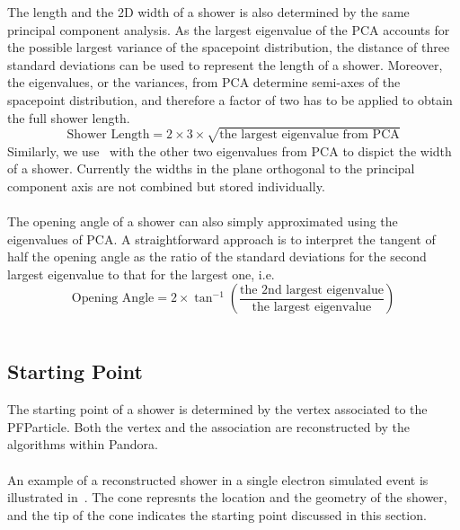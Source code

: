 The length and the 2D width of a shower is also determined by the same
principal component analysis.
As the largest eigenvalue of the PCA accounts for the possible largest
variance of the spacepoint distribution, the distance of three
standard deviations can be used to represent the length of a shower.
Moreover, the eigenvalues, or the variances, from PCA determine semi-axes
of the spacepoint distribution, and therefore a factor of two has to be
applied to obtain the full shower length.
\begin{equation}
\label{eq:shrlength}
\textrm{Shower Length} = 2\times 3\times \sqrt{\textrm{the largest eigenvalue from PCA}}
\end{equation}
Similarly, we use~ with the other two eigenvalues
from PCA to dispict the width of a shower.
Currently the widths in the plane orthogonal to the principal component
axis are not combined but stored individually.\\
\\
The opening angle of a shower can also simply approximated using the
eigenvalues of PCA.
A straightforward approach is to interpret the tangent of half the 
opening angle as the ratio of the standard deviations for the second
largest eigenvalue to that for the largest one, i.e.
\begin{equation}
\label{eq:shropeningangle}
\textrm{Opening Angle} = 2\times \tan^{-1}({\frac{\textrm{the 2nd largest eigenvalue}}{\textrm{the largest eigenvalue}}})
\end{equation}
\\
\subsection{Starting Point}
\label{sec:shr_startingpt}

The starting point of a shower is determined by the vertex associated to
the PFParticle.
Both the vertex and the association are reconstructed by the algorithms
within Pandora.\\
\\
An example of a reconstructed shower in a single electron simulated event
is illustrated in~.
The cone represnts the location and the geometry of the shower, and
the tip of the cone indicates the starting point discussed in this section.

